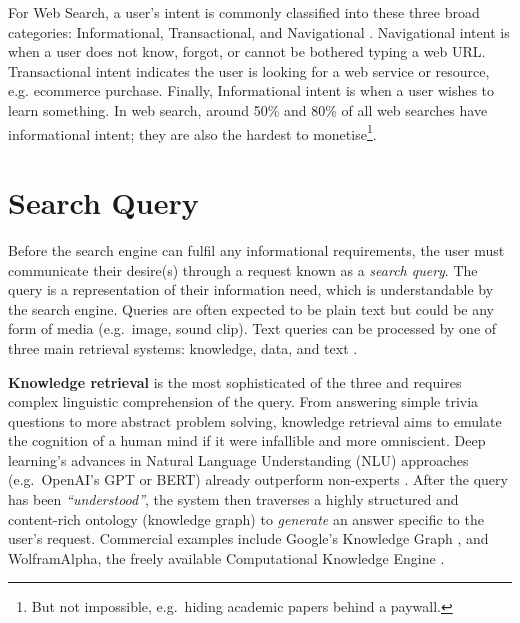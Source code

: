 For Web Search, a user's intent is commonly classified into these three broad categories: Informational, Transactional, and Navigational \cite{broder2002taxonomy}. Navigational intent is when a user does not know, forgot, or cannot be bothered typing a web URL. Transactional intent indicates the user is looking for a web service or resource, e.g. ecommerce purchase. Finally, Informational intent is when a user wishes to learn something. In web search, around 50\% \cite{broder2002taxonomy} and 80\% \cite{jansen2008determining} of all web searches have informational intent; they are also the hardest to monetise\footnote{But not impossible, e.g.\ hiding academic papers behind a paywall.}.


\section{Search Query}
Before the search engine can fulfil any informational requirements, the user must communicate their desire(s) through a request known as a \textit{search query}. The query is a representation of their information need, which is understandable by the search engine. Queries are often expected to be plain text but could be any form of media (e.g.\ image, sound clip). Text queries can be processed by one of three main retrieval systems: knowledge, data, and text \cite{lewis1996natural}.

\textbf{Knowledge retrieval} is the most sophisticated of the three and requires complex linguistic comprehension of the query. From answering simple trivia questions to more abstract problem solving, knowledge retrieval aims to emulate the cognition of a human mind if it were infallible and more omniscient. Deep learning's advances in Natural Language Understanding (NLU) approaches (e.g.\ OpenAI's GPT or BERT) already outperform non-experts \cite{wang2019superglue}. After the query has been \textit{``understood''}, the system then traverses a highly structured and content-rich ontology (knowledge graph) to \textit{generate} an answer specific to the user's request. Commercial examples include Google's Knowledge Graph \cite{singhal2012introducing}, and WolframAlpha, the freely available Computational Knowledge Engine \cite{wolfram2012wolframalpha}.


